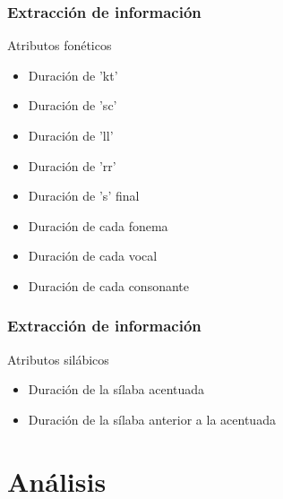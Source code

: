 \documentclass[mathserif]{beamer}%
\begin{document}
\begin{frame}
\begin{figure}[H]
		\end{figure}
\end{frame}

\begin{frame}
	\frametitle{Extracción de información}
	\Large {Atributos fonéticos}
	
	\begin{itemize}
		\item Duración de 'kt'
		\item Duración de 'sc'
		\item Duración de 'll'
		\item Duración de 'rr'
		\item Duración de 's' final
		\item Duración de cada fonema
		\item Duración de cada vocal 
		\item Duración de cada consonante
	\end{itemize}
\end{frame}



\begin{frame}
	\frametitle{Extracción de información}
	\Large {Atributos silábicos}
		
	\begin{itemize}
		\item Duración de la sílaba acentuada
		\item Duración de la sílaba anterior a la acentuada
	\end{itemize}
\end{frame}

\section{Análisis}
\end{document}
